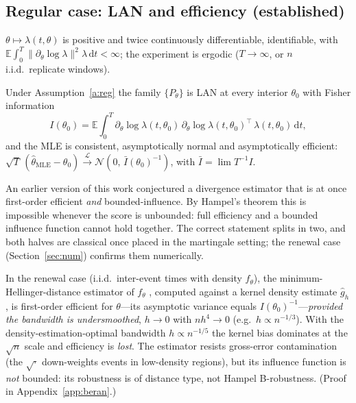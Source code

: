 \documentclass[smallextended,natbib]{svjour3}
\newcommand{\dd}{\,\mathrm{d}}
\newcommand{\E}{\mathbb{E}}
\newcommand{\toL}{\xrightarrow{\mathcal{L}}}
\begin{document}
\subsection{Regular case: LAN and efficiency (established)}
\begin{assumption}\label{a:reg}
$\theta\mapsto\lambda(t,\theta)$ is positive and twice continuously
differentiable, identifiable, with $\E\int_0^T\|\partial_\theta\log\lambda\|^2\lambda\dd t<\infty$;
the experiment is ergodic ($T\to\infty$, or $n$ i.i.d.\ replicate windows).
\end{assumption}
\begin{theorem}\label{thm:lan}
Under Assumption~\ref{a:reg} the family $\{P_\theta\}$ is LAN at every interior
$\theta_0$ with Fisher information
\begin{equation}\label{eq:fisher}
I(\theta_0)=\E\int_0^T \partial_\theta\log\lambda(t,\theta_0)\,
\partial_\theta\log\lambda(t,\theta_0)^{\!\top}\,\lambda(t,\theta_0)\dd t ,
\end{equation}
and the MLE is consistent, asymptotically normal and asymptotically efficient:
$\sqrt{T}\,(\hat\theta_{\mathrm{MLE}}-\theta_0)\toL \mathcal N(0,\,\bar I(\theta_0)^{-1})$,
with $\bar I=\lim T^{-1}I$. \citep{kutoyants1998,kutoyants1984,ih1981}
\end{theorem}
\begin{remark}
\label{rem:hampel}
An earlier version of this work conjectured a divergence estimator that is at once
first-order efficient \emph{and} bounded-influence. By Hampel's theorem this is
impossible whenever the score is unbounded: full efficiency and a bounded influence
function cannot hold together. The correct statement splits in two, and both halves
are classical once placed in the martingale setting; the renewal case
(Section~\ref{sec:num}) confirms them numerically.
\end{remark}
\begin{proposition}
\label{prop:beran}
In the renewal case (i.i.d.\ inter-event times with density $f_\theta$), the
minimum-Hellinger-distance estimator of $f_\theta$ \citep{beran1977}, computed against
a kernel density estimate $\hat g_h$, is first-order efficient for $\theta$---its
asymptotic variance equals $I(\theta_0)^{-1}$---\emph{provided the bandwidth is
undersmoothed}, $h\to0$ with $n h^4\to0$ (e.g.\ $h\propto n^{-1/3}$). With the
density-estimation-optimal bandwidth $h\propto n^{-1/5}$ the kernel bias dominates at
the $\sqrt n$ scale and efficiency is \emph{lost}. The estimator resists gross-error
contamination (the $\sqrt{\cdot}$ down-weights events in low-density regions), but its
influence function is \emph{not} bounded: its robustness is of distance type, not
Hampel B-robustness. (Proof in Appendix~\ref{app:beran}.)
\end{proposition}
\end{document}
